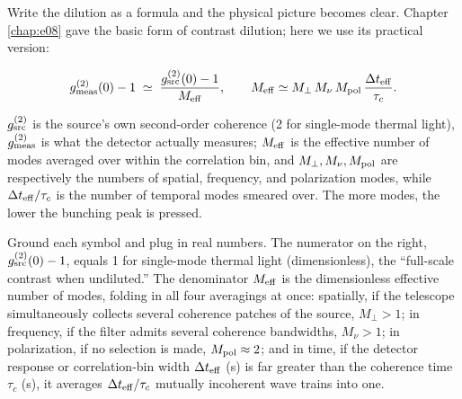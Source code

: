 Write the dilution as a formula and the physical picture becomes clear. Chapter \ref{chap:e08} gave the basic form of contrast dilution; here we use its practical version:

\begin{equation}
  g^{(2)}_{\rm meas}(0)-1
  \;\simeq\;
  \frac{g^{(2)}_{\rm src}(0)-1}{M_{\rm eff}},
  \qquad
  M_{\rm eff}\simeq M_\perp\,M_\nu\,M_{\rm pol}\,\frac{\Delta t_{\rm eff}}{\tau_c}.
  \label{eq:e27-dilution}
\end{equation}
\begin{formulaexplain}
\(g^{(2)}_{\rm src}\) is the source's own second-order coherence (2 for single-mode thermal light), \(g^{(2)}_{\rm meas}\) is what the detector actually measures; \(M_{\rm eff}\) is the effective number of modes averaged over within the correlation bin, and \(M_\perp,M_\nu,M_{\rm pol}\) are respectively the numbers of spatial, frequency, and polarization modes, while \(\Delta t_{\rm eff}/\tau_c\) is the number of temporal modes smeared over. The more modes, the lower the bunching peak is pressed.
\end{formulaexplain}

Ground each symbol and plug in real numbers. The numerator on the right, \(g^{(2)}_{\rm src}(0)-1\), equals 1 for single-mode thermal light (dimensionless), the ``full-scale contrast when undiluted.'' The denominator \(M_{\rm eff}\) is the dimensionless effective number of modes, folding in all four averagings at once: spatially, if the telescope simultaneously collects several coherence patches of the source, \(M_\perp>1\); in frequency, if the filter admits several coherence bandwidths, \(M_\nu>1\); in polarization, if no selection is made, \(M_{\rm pol}\approx2\); and in time, if the detector response or correlation-bin width \(\Delta t_{\rm eff}\) (s) is far greater than the coherence time \(\tau_c\) (s), it averages \(\Delta t_{\rm eff}/\tau_c\) mutually incoherent wave trains into one.

